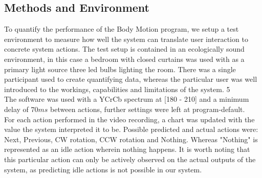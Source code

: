 \documentclass[11pt,a4paper]{article}
\begin{document}
\subsection{Methods and Environment}
To quantify the performance of the Body Motion program, we setup a test environment to measure how well the system can translate user interaction to concrete system actions. The test setup is contained in an ecologically sound environment, in this case a bedroom with closed curtains was used with as a primary light source three led bulbs lighting the room. There was a single participant used to create quantifying data, whereas the particular user was well introduced to the workings, capabilities and limitations of the system. 
5\\ The software was used with a YCrCb spectrum at [180 - 210] and a minimum delay of $70ms$ between actions, further settings were left at program-default.
\\ For each action performed in the video recording, a chart was updated with the value the system interpreted it to be. Possible predicted and actual actions were: Next, Previous, CW rotation, CCW rotation and Nothing. Whereas "Nothing" is represented as an idle action wherein nothing happens. It is worth noting that this particular action can only be actively observed on the actual outputs of the system, as predicting idle actions is not possible in our system.
\end{document}
